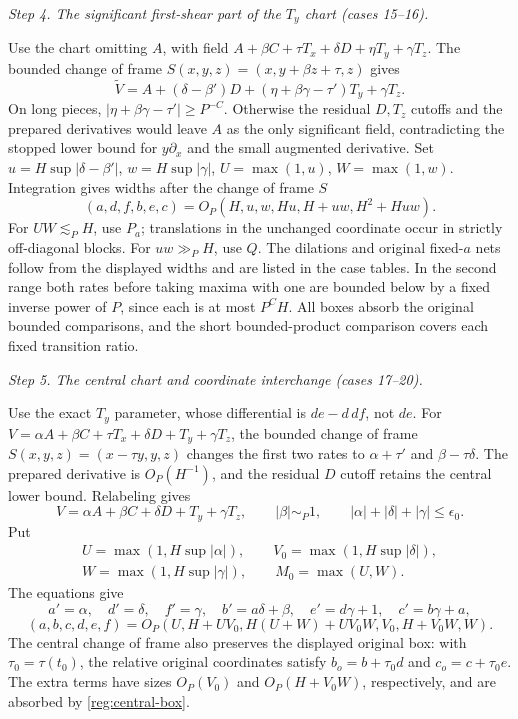 \documentclass[11pt]{amsart}
\theoremstyle{definition}
\theoremstyle{remark}
\numberwithin{equation}{section}
\begin{document}
\par\medskip\noindent\textit{Step 4. The significant first-shear part of the $T_y$ chart (cases 15--16).}\par\nobreak\smallskip
Use the chart omitting $A$, with field $A+\beta C+\tau T_x+\delta D+\eta T_y+\gamma T_z$. The bounded change of frame $S(x,y,z)=(x,y+\beta z+\tau,z)$ gives
\[
\widetilde V=A+(\delta-\beta')D+(\eta+\beta\gamma-\tau')T_y+\gamma T_z.
\]
On long pieces, $|\eta+\beta\gamma-\tau'|\ge P^{-C}$. Otherwise the residual $D,T_z$ cutoffs and the prepared derivatives would leave $A$ as the only significant field, contradicting the stopped lower bound for $y\partial_x$ and the small augmented derivative. Set $u=H\sup|\delta-\beta'|$, $w=H\sup|\gamma|$, $U=\max(1,u)$, $W=\max(1,w)$. Integration gives widths after the change of frame $S$
\[
(a,d,f,b,e,c)=O_P(H,u,w,Hu,H+uw,H^2+Huw).
\]
For $UW\lesssim_PH$, use $P_a$; translations in the unchanged coordinate occur in strictly off-diagonal blocks. For $uw\gg_PH$, use $Q$. The dilations and original fixed-$a$ nets follow from the displayed widths and are listed in the case tables. In the second range both rates before taking maxima with one are bounded below by a fixed inverse power of $P$, since each is at most $P^CH$. All boxes absorb the original bounded comparisons, and the short bounded-product comparison covers each fixed transition ratio.

\par\medskip\noindent\textit{Step 5. The central chart and coordinate interchange (cases 17--20).}\par\nobreak\smallskip
Use the exact $T_y$ parameter, whose differential is $de-d\,df$, not $de$. For $V=\alpha A+\beta C+\tau T_x+\delta D+T_y+\gamma T_z$, the bounded change of frame $S(x,y,z)=(x-\tau y,y,z)$ changes the first two rates to $\alpha+\tau'$ and $\beta-\tau\delta$. The prepared derivative is $O_P(H^{-1})$, and the residual $D$ cutoff retains the central lower bound. Relabeling gives
\[
V=\alpha A+\beta C+\delta D+T_y+\gamma T_z,\qquad |\beta|\sim_P1,\qquad |\alpha|+|\delta|+|\gamma|\le\epsilon_0.
\]
Put
\[
\begin{gathered}
U=\max(1,H\sup|\alpha|),\qquad V_0=\max(1,H\sup|\delta|),\\
W=\max(1,H\sup|\gamma|),\qquad M_0=\max(U,W).
\end{gathered}
\]
The equations give
\begin{equation}\label{reg:central-equations}
a'=\alpha,\quad d'=\delta,\quad f'=\gamma,\quad b'=a\delta+\beta,\quad e'=d\gamma+1,\quad c'=b\gamma+a,
\end{equation}
\begin{equation}\label{reg:central-box}
(a,b,c,d,e,f)=O_P(U,H+UV_0,H(U+W)+UV_0W,V_0,H+V_0W,W).
\end{equation}
The central change of frame also preserves the displayed original box: with $\tau_0=\tau(t_0)$, the relative original coordinates satisfy $b_o=b+\tau_0d$ and $c_o=c+\tau_0e$. The extra terms have sizes $O_P(V_0)$ and $O_P(H+V_0W)$, respectively, and are absorbed by \eqref{reg:central-box}.
\end{document}
